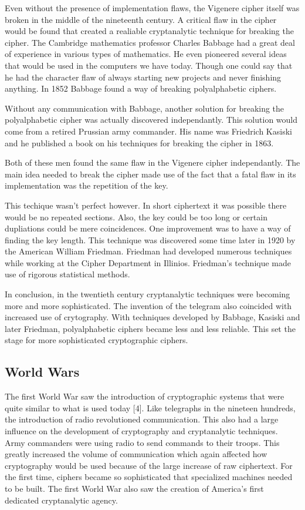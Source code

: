 \documentclass{article}
\begin{document}
    Even without the presence of implementation flaws, the Vigenere cipher itself was
    broken in the middle of the nineteenth century. A critical flaw in the cipher
    would be found that created a realiable cryptanalytic technique for breaking
    the cipher.
    The Cambridge mathematics professor Charles Babbage had a great deal of
    experience in various types of mathematics. He even pioneered several ideas
    that would be used in the computers we have today. Though one could say that
    he had the character flaw of always starting new projects and never finishing anything.
    In 1852 Babbage found a way of breaking polyalphabetic ciphers.

    Without any communication with Babbage, another solution for breaking the polyalphabetic
    cipher was actually discovered independantly. This solution would come
    from a retired Prussian army commander. His name was Friedrich Kasiski and he published
    a book on his techniques for breaking the cipher in 1863.

    Both of these men found the same flaw in the Vigenere cipher independantly.
    The main idea needed to break the cipher made use of the fact that a fatal
    flaw in its implementation was the repetition of the key.

    This techique wasn't perfect however. In short ciphertext it was possible there
    would be no repeated sections. Also, the key could be too long or certain dupliations
    could be mere coincidences.
    One improvement was to have a way of finding the key length. This technique was
    discovered some time later in 1920 by the American William Friedman. Friedman had
    developed numerous techniques while working at the Cipher Department in Illinios.
    Friedman's technique made use of rigorous statistical methods.

    In conclusion, in the twentieth century cryptanalytic techniques were becoming
    more and more sophisticated. The invention of the telegram also coincided
    with increased use of crytography. With techniques developed by Babbage,
    Kasiski and later Friedman, polyalphabetic ciphers became less and less reliable.
    This set the stage for more sophisticated cryptographic ciphers.

    \subsection{World Wars}

    The first World War saw the introduction of cryptographic systems that
    were quite similar to what is used today [4]. Like telegraphs in the nineteen
    hundreds, the introduction of radio revolutioned communication.
    This also had a large influence on the development of cryptography and cryptanalytic
    techniques. Army commanders were using radio to send commands to their troops.
    This greatly increased the volume of communication which again affected how
    cryptography would be used because of the large increase of raw ciphertext.
    For the first time, ciphers became so sophisticated that specialized machines
    needed to be built. The first World War also saw the creation of America's
    first dedicated cryptanalytic agency.
\end{document}

